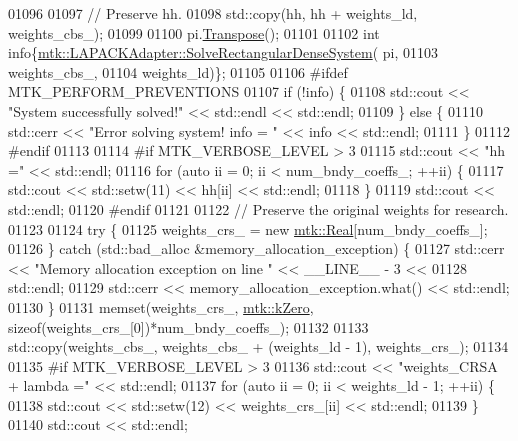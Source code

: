 \begin{DoxyCode}
{{01096 
01097   \textcolor{comment}{// Preserve hh.}
01098   std::copy(hh, hh + weights\_ld, weights\_cbs\_);
01099 
01100   pi.\hyperlink{classmtk_1_1DenseMatrix_a71d9c07ca66e88d97d1fd5012f43138b}{Transpose}();
01101 
01102   \textcolor{keywordtype}{int} info\{\hyperlink{classmtk_1_1LAPACKAdapter_a380f148ffdf96bae2f79ae28f1a6560c}{mtk::LAPACKAdapter::SolveRectangularDenseSystem}(
      pi,
01103                                                            weights\_cbs\_,
01104                                                            weights\_ld)\};
01105 
01106 \textcolor{preprocessor}{  #ifdef MTK\_PERFORM\_PREVENTIONS}
01107   \textcolor{keywordflow}{if} (!info) \{
01108     std::cout << \textcolor{stringliteral}{"System successfully solved!"} << std::endl << std::endl;
01109   \} \textcolor{keywordflow}{else} \{
01110     std::cerr << \textcolor{stringliteral}{"Error solving system! info = "} << info << std::endl;
01111   \}
01112 \textcolor{preprocessor}{  #endif}
01113 
01114 \textcolor{preprocessor}{  #if MTK\_VERBOSE\_LEVEL > 3}
01115   std::cout << \textcolor{stringliteral}{"hh ="} << std::endl;
01116   \textcolor{keywordflow}{for} (\textcolor{keyword}{auto} ii = 0; ii < num\_bndy\_coeffs\_; ++ii) \{
01117     std::cout << std::setw(11) << hh[ii] << std::endl;
01118   \}
01119   std::cout << std::endl;
01120 \textcolor{preprocessor}{  #endif}
01121 
01122   \textcolor{comment}{// Preserve the original weights for research.}
01123 
01124   \textcolor{keywordflow}{try} \{
01125     weights\_crs\_ = \textcolor{keyword}{new} \hyperlink{group__c01-roots_gac080bbbf5cbb5502c9f00405f894857d}{mtk::Real}[num\_bndy\_coeffs\_];
01126   \} \textcolor{keywordflow}{catch} (std::bad\_alloc &memory\_allocation\_exception) \{
01127     std::cerr << \textcolor{stringliteral}{"Memory allocation exception on line "} << \_\_LINE\_\_ - 3 <<
01128       std::endl;
01129     std::cerr << memory\_allocation\_exception.what() << std::endl;
01130   \}
01131   memset(weights\_crs\_, \hyperlink{group__c01-roots_ga59a451a5fae30d59649bcda274fea271}{mtk::kZero}, \textcolor{keyword}{sizeof}(weights\_crs\_[0])*num\_bndy\_coeffs\_);
01132 
01133   std::copy(weights\_cbs\_, weights\_cbs\_ + (weights\_ld - 1), weights\_crs\_);
01134 
01135 \textcolor{preprocessor}{  #if MTK\_VERBOSE\_LEVEL > 3}
01136   std::cout << \textcolor{stringliteral}{"weights\_CRSA + lambda ="} << std::endl;
01137   \textcolor{keywordflow}{for} (\textcolor{keyword}{auto} ii = 0; ii < weights\_ld - 1; ++ii) \{
01138     std::cout << std::setw(12) << weights\_crs\_[ii] << std::endl;
01139   \}
01140   std::cout << std::endl;
}}
\end{DoxyCode}
